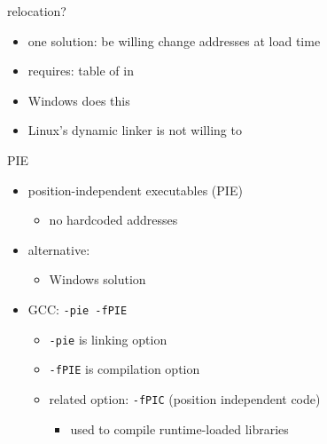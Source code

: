 \begin{frame}{relocation?}
    \begin{itemize}
        \item one solution: be willing change addresses at load time
        \item requires: table of  in 
        \item Windows does this
        \item Linux's dynamic linker is not willing to
    \end{itemize}
\end{frame}

\begin{frame}{PIE}
    \begin{itemize}
    \item position-independent executables (PIE)
        \begin{itemize}
        \item no hardcoded addresses
        \end{itemize}
    \item alternative: 
        \begin{itemize}
        \item Windows solution
        \end{itemize}
    \item GCC: \texttt{-pie -fPIE}
        \begin{itemize}
        \item \texttt{-pie} is linking option
        \item \texttt{-fPIE} is compilation option
        \item related option: \texttt{-fPIC} (position independent code)
            \begin{itemize}
            \item used to compile runtime-loaded libraries
            \end{itemize}
        \end{itemize}
    \end{itemize}
\end{frame}

